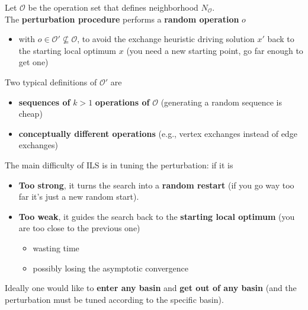 \documentclass[11pt]{article}
\begin{document}
	Let $\mathcal{O}$ be the operation set that defines neighborhood $N_{\mathcal{O}}$.\\
	
	The \textbf{perturbation procedure} performs a \textbf{random operation} $o$
	\begin{itemize}
		\item with $o \in \mathcal{O}' \not \subseteq \mathcal{O}$, to avoid the exchange heuristic driving solution $x'$ back to the starting local optimum $x$ (you need a new starting point, go far enough to get one)
	\end{itemize}
	
	Two typical definitions of $\mathcal{O}'$ are
	\begin{itemize}
		\item \textbf{sequences of} $k > 1$ \textbf{operations of} $\mathcal{O}$ (generating a random sequence is cheap)
		
		\item \textbf{conceptually different operations} (e.g., vertex exchanges instead of edge exchanges)
	\end{itemize}
	
	The main difficulty of ILS is in tuning the perturbation: if it is
	\begin{itemize}
		\item \textbf{Too strong}, it turns the search into a \textbf{random restart} (if you go way too far it's just a new random start).\\
		
		\item \textbf{Too weak}, it guides the search back to the \textbf{starting local optimum} (you are too close to the previous one)
		\begin{itemize}
			\item wasting time
			\item possibly losing the asymptotic convergence
		\end{itemize}
		\nn
	\end{itemize}
	
	Ideally one would like to \textbf{enter any basin} and \textbf{get out of any basin} (and the perturbation must be tuned according to the specific basin).\\
	
	\newpage
	
\end{document}
